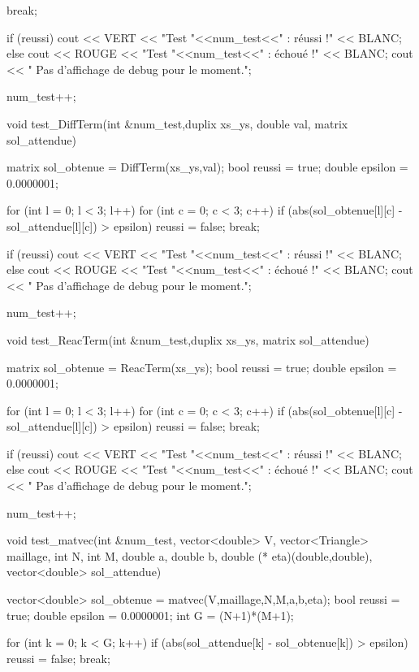 \begin{codeblock}
{{{            break;
        }
    }

    if (reussi){
        cout << VERT << "Test "<<num_test<<" : réussi !\n" << BLANC;
    } else {
        cout << ROUGE << "Test "<<num_test<<" : échoué !\n" << BLANC;
        cout << "   Pas d'affichage de debug pour le moment.\n";
    }

    num_test++;
}


void test_DiffTerm(int &num_test,duplix xs_ys, double val, matrix sol_attendue){

    matrix sol_obtenue = DiffTerm(xs_ys,val);
    bool reussi = true;
    double epsilon = 0.0000001;

    for (int l = 0; l < 3; l++){
        for (int c = 0; c < 3; c++){
            if (abs(sol_obtenue[l][c] - sol_attendue[l][c]) > epsilon){
                reussi = false;
                break;
            }
        }
    }

    if (reussi){
        cout << VERT << "Test "<<num_test<<" : réussi !\n" << BLANC;
    } else {
        cout << ROUGE << "Test "<<num_test<<" : échoué !\n" << BLANC;
        cout << "   Pas d'affichage de debug pour le moment.\n";
    }

    num_test++;
}


void test_ReacTerm(int &num_test,duplix xs_ys, matrix sol_attendue){

    matrix sol_obtenue = ReacTerm(xs_ys);
    bool reussi = true;
    double epsilon = 0.0000001;

    for (int l = 0; l < 3; l++){
        for (int c = 0; c < 3; c++){
            if (abs(sol_obtenue[l][c] - sol_attendue[l][c]) > epsilon){
                reussi = false;
                break;
            }
        }
    }

    if (reussi){
        cout << VERT << "Test "<<num_test<<" : réussi !\n" << BLANC;
    } else {
        cout << ROUGE << "Test "<<num_test<<" : échoué !\n" << BLANC;
        cout << "   Pas d'affichage de debug pour le moment.\n";
    }

    num_test++;
}


void test_matvec(int &num_test, vector<double> V, vector<Triangle> maillage,
    int N, int M, double a, double b, double (* eta)(double,double),
    vector<double> sol_attendue){


    vector<double> sol_obtenue = matvec(V,maillage,N,M,a,b,eta);
    bool reussi = true;
    double epsilon = 0.0000001;
    int G = (N+1)*(M+1);

    for (int k = 0; k < G; k++){
        if (abs(sol_attendue[k] - sol_obtenue[k]) > epsilon){
            reussi = false;
            break;
        }
    }

}
\end{codeblock}
